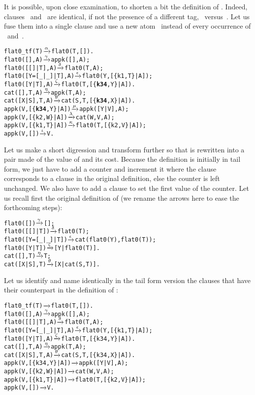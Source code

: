 It is possible, upon close examination, to shorten a bit the
definition of . Indeed, clauses
\clause{\nu}~and~\clause{\mu} are identical, if not the presence of a
different tag, ~versus~. Let us fuse them into
a single clause and use a new atom~ instead of every
occurrence of ~and~.
\begin{alltt}
flat0\_tf(T)          \(\smashedrightarrow{\alpha}\) flat0(T,[]).
flat0(         [],A) \(\smashedrightarrow{\gamma}\) appk([],A);
flat0(     [[]|T],A) \(\smashedrightarrow{\delta}\) flat0(T,A);
flat0([Y=[\_|\_]|T],A) \(\smashedrightarrow{\epsilon}\) flat0(Y,[\{k1,T\}|A]);
flat0(      [Y|T],A) \(\smashedrightarrow{\zeta}\) flat0(T,[\{\textbf{k34},Y\}|A]).
cat(   [],T,A)       \(\smashedrightarrow{\eta}\) appk(T,A);
cat([X|S],T,A)       \(\smashedrightarrow{\theta}\) cat(S,T,[\{\textbf{k34},X\}|A]).
appk(V,[\{\textbf{k34},Y\}|A])  \(\smashedrightarrow{\mu}\) appk([Y|V],A);
appk(V, [\{k2,W\}|A])  \(\smashedrightarrow{\lambda}\) cat(W,V,A);
appk(V, [\{k1,T\}|A])  \(\smashedrightarrow{\kappa}\) flat0(T,[\{k2,V\}|A]);
appk(V,         [])  \(\smashedrightarrow{\iota}\) V.
\end{alltt}
Let us make a short digression and transform 
further so that  is rewritten into a pair
made of the value of  and its cost. Because the
definition is initially in tail form, we just have to add a counter
and increment it where the clause corresponds to a clause in the original
definition, else the counter is left unchanged. We also have to add a
clause to set the first value of the counter. Let us recall first the
original definition of  (we rename the arrows here to
ease the forthcoming steps):
\begin{alltt}
flat0(         []) \(\smashedrightarrow{\gamma}\) [];
flat0(     [[]|T]) \(\smashedrightarrow{\delta}\) flat0(T);
flat0([Y=[\_|\_]|T]) \(\smashedrightarrow{\epsilon}\) cat(flat0(Y),flat0(T));
flat0(      [Y|T]) \(\smashedrightarrow{\zeta}\) [Y|flat0(T)].
cat(   [],T)       \(\smashedrightarrow{\eta}\) T;
cat([X|S],T)       \(\smashedrightarrow{\theta}\) [X|cat(S,T)].
\end{alltt}
Let us identify and name identically in the tail form version
 the clauses that have their counterpart in the
definition of :
\begin{alltt}
flat0\_tf(T)          \(\smashedrightarrow{\phantom{\gamma}}\) flat0(T,[]).
flat0(       [],A)   \(\smashedrightarrow{\gamma}\) appk([],A);
flat0(   [[]|T],A)   \(\smashedrightarrow{\delta}\) flat0(T,A);
flat0([Y=[\_|\_]|T],A) \(\smashedrightarrow{\epsilon}\) flat0(Y,[\{k1,T\}|A]);
flat0(    [Y|T],A)   \(\smashedrightarrow{\zeta}\) flat0(T,[\{k34,Y\}|A]).
cat(   [],T,A)       \(\smashedrightarrow{\eta}\) appk(T,A);
cat([X|S],T,A)       \(\smashedrightarrow{\theta}\) cat(S,T,[\{k34,X\}|A]).
appk(V,[\{k34,Y\}|A])  \(\smashedrightarrow{\phantom{\theta}}\) appk([Y|V],A);
appk(V, [\{k2,W\}|A])  \(\smashedrightarrow{\phantom{\theta}}\) cat(W,V,A);
appk(V, [\{k1,T\}|A])  \(\smashedrightarrow{\phantom{\theta}}\) flat0(T,[\{k2,V\}|A]);
appk(V,         [])  \(\smashedrightarrow{\phantom{\theta}}\) V.
\end{alltt}

